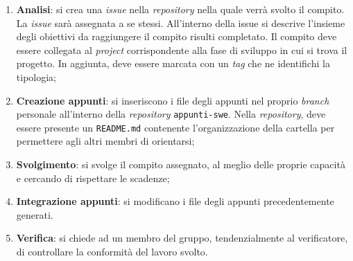 \begin{enumerate}
	\item \textbf{Analisi}: si crea una \textit{issue} nella \textit{repository}
	      nella quale verrà svolto il compito. La \textit{issue} sarà assegnata
	      a se stessi. All'interno della issue si descrive l'insieme degli
	      obiettivi da raggiungere il compito risulti completato.
	      Il compito deve essere collegata al \textit{project} corrispondente
	      alla fase di sviluppo in cui si trova il progetto. In aggiunta, deve
	      essere marcata con un \textit{tag} che ne identifichi la tipologia;

	\item \textbf{Creazione appunti}: si inseriscono i file degli
	      appunti nel proprio \textit{branch} personale all'interno
	      della \textit{repository} \texttt{appunti-swe}.
	      Nella \textit{repository}, deve essere presente un \texttt{README.md}
	      contenente l'organizzazione della cartella per permettere agli altri
	      membri di orientarsi;

	\item \textbf{Svolgimento}: si svolge il compito assegnato, al meglio
	      delle proprie capacità e cercando di rispettare le scadenze;

	\item \textbf{Integrazione appunti}: si modificano i file degli
	      appunti precedentemente generati.

	\item \textbf{Verifica}: si chiede ad un membro del gruppo,
	      tendenzialmente al verificatore, di controllare la conformità del
	      lavoro svolto.
\end{enumerate}
